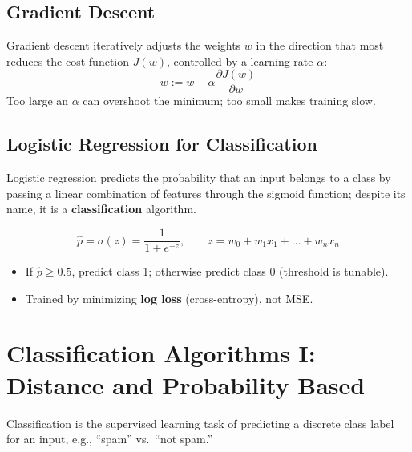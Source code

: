 \documentclass[11pt,a4paper]{article}
\begin{document}
\subsection{Gradient Descent}
\begin{conceptbox}
Gradient descent iteratively adjusts the weights $w$ in the direction that most reduces the cost function $J(w)$, controlled by a learning rate $\alpha$:
$$
w := w - \alpha \frac{\partial J(w)}{\partial w}
$$
Too large an $\alpha$ can overshoot the minimum; too small makes training slow.
\end{conceptbox}

\subsection{Logistic Regression for Classification}
\begin{definitionbox}
Logistic regression predicts the probability that an input belongs to a class by passing a linear combination of features through the sigmoid function; despite its name, it is a \textbf{classification} algorithm.
\end{definitionbox}
$$
\hat{p} = \sigma(z) = \frac{1}{1+e^{-z}}, \qquad z = w_0 + w_1 x_1 + \dots + w_n x_n
$$
\begin{itemize}[leftmargin=*]
  \item If $\hat{p} \geq 0.5$, predict class 1; otherwise predict class 0 (threshold is tunable).
  \item Trained by minimizing \textbf{log loss} (cross-entropy), not MSE.
\end{itemize}

\section{Classification Algorithms I: Distance and Probability Based}

\begin{definitionbox}[Classification]
Classification is the supervised learning task of predicting a discrete class label for an input, e.g., ``spam'' vs.\ ``not spam.''
\end{definitionbox}
\end{document}

